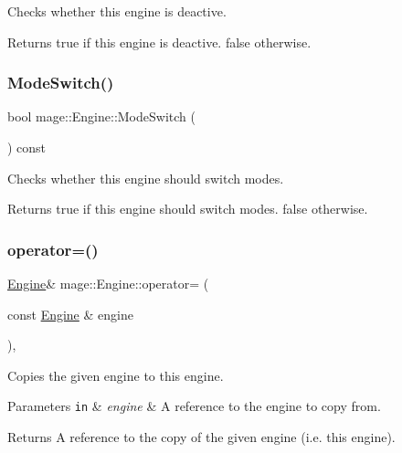 Checks whether this engine is deactive.

\begin{DoxyReturn}{Returns}
{\ttfamily true} if this engine is deactive. {\ttfamily false} otherwise. 
\end{DoxyReturn}
\hypertarget{classmage_1_1_engine_a54cb08ec26da300b0c7ca4e7f9a35e0b}{}\label{classmage_1_1_engine_a54cb08ec26da300b0c7ca4e7f9a35e0b} 
\subsubsection{\texorpdfstring{Mode\+Switch()}{ModeSwitch()}}
{\footnotesize\ttfamily bool mage\+::\+Engine\+::\+Mode\+Switch (\begin{DoxyParamCaption}{ }\end{DoxyParamCaption}) const\hspace{0.3cm}{\ttfamily [private]}}

Checks whether this engine should switch modes.

\begin{DoxyReturn}{Returns}
{\ttfamily true} if this engine should switch modes. {\ttfamily false} otherwise. 
\end{DoxyReturn}
\hypertarget{classmage_1_1_engine_a1eedff82d4c8207c61676230520648fd}{}\label{classmage_1_1_engine_a1eedff82d4c8207c61676230520648fd} 
\subsubsection{\texorpdfstring{operator=()}{operator=()}\hspace{0.1cm}{\footnotesize\ttfamily [1/2]}}
{\footnotesize\ttfamily \hyperlink{classmage_1_1_engine}{Engine}\& mage\+::\+Engine\+::operator= (\begin{DoxyParamCaption}\item[{const \hyperlink{classmage_1_1_engine}{Engine} \&}]{engine }\end{DoxyParamCaption})\hspace{0.3cm}{\ttfamily [private]}, {\ttfamily [delete]}}

Copies the given engine to this engine.


\begin{DoxyParams}[1]{Parameters}
\mbox{\tt in}  & {\em engine} & A reference to the engine to copy from. \\
\hline
\end{DoxyParams}
\begin{DoxyReturn}{Returns}
A reference to the copy of the given engine (i.\+e. this engine). 
\end{DoxyReturn}
\hypertarget{classmage_1_1_engine_a22607a263e0be5e179cc0e4bf13b18f7}{}\label{classmage_1_1_engine_a22607a263e0be5e179cc0e4bf13b18f7} 
